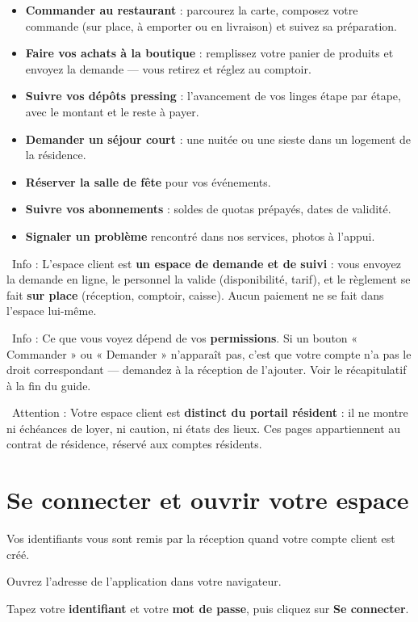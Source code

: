 \documentclass[12pt,a4paper]{article}
\newcommand{\attention}[1]{\par\noindent\textcolor{warn}{\faExclamationTriangle\ Attention : #1}\par}
\newcommand{\info}[1]{\par\noindent\textcolor{lagoon}{\faInfoCircle\ Info : #1}\par}
\begin{document}
\begin{itemize}[label=\textcolor{lagoon}{\faFile}]
  \item \textbf{Commander au restaurant} : parcourez la carte, composez votre commande (sur place, à emporter ou en livraison) et suivez sa préparation.
  \item \textbf{Faire vos achats à la boutique} : remplissez votre panier de produits et envoyez la demande — vous retirez et réglez au comptoir.
  \item \textbf{Suivre vos dépôts pressing} : l'avancement de vos linges étape par étape, avec le montant et le reste à payer.
  \item \textbf{Demander un séjour court} : une nuitée ou une sieste dans un logement de la résidence.
  \item \textbf{Réserver la salle de fête} pour vos événements.
  \item \textbf{Suivre vos abonnements} : soldes de quotas prépayés, dates de validité.
  \item \textbf{Signaler un problème} rencontré dans nos services, photos à l'appui.
\end{itemize}

\info{L'espace client est \textbf{un espace de demande et de suivi} : vous envoyez la demande en ligne, le personnel la valide (disponibilité, tarif), et le règlement se fait \textbf{sur place} (réception, comptoir, caisse). Aucun paiement ne se fait dans l'espace lui-même.}

\info{Ce que vous voyez dépend de vos \textbf{permissions}. Si un bouton « Commander » ou « Demander » n'apparaît pas, c'est que votre compte n'a pas le droit correspondant — demandez à la réception de l'ajouter. Voir le récapitulatif à la fin du guide.}

\attention{Votre espace client est \textbf{distinct du portail résident} : il ne montre ni échéances de loyer, ni caution, ni états des lieux. Ces pages appartiennent au contrat de résidence, réservé aux comptes résidents.}

\newpage

\section{Se connecter et ouvrir votre espace}\label{sec:connexion}

Vos identifiants vous sont remis par la réception quand votre compte client est créé.

\begin{etapes}
  \item Ouvrez l'adresse de l'application dans votre navigateur.
  \item Tapez votre \textbf{identifiant} et votre \textbf{mot de passe}, puis cliquez sur \textbf{Se connecter}.
\end{etapes}
\end{document}
